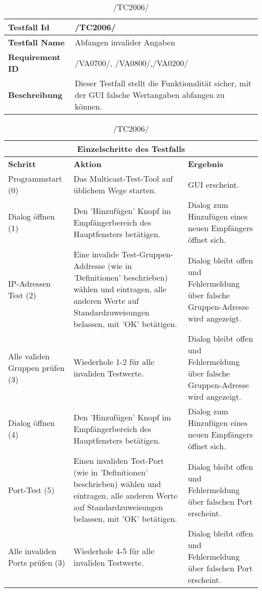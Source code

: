 \begin{table}[h]
\caption{/TC2006/}
\label{tab:TC2006}
\begin{center}
\begin{tabular}{|p{3.5cm}|p{12cm}|}
\hline
\textbf{Testfall Id} & /TC2006/\\
\hline
\textbf{Testfall Name} & Abfangen invalider Angaben\\
\hline
\textbf{Requirement ID} & /VA0700/, /VA0800/,/VA0200/\\
\hline
\textbf{Beschreibung} & Dieser Testfall stellt die Funktionalität sicher, mit
der GUI falsche Wertangaben abfangen zu können.\\
\hline
\end{tabular}
\begin{tabular}{|p{2.5cm}|p{5cm}|p{7.55cm}|}
\multicolumn{3}{|c|}{\textbf{Einzelschritte des Testfalls}} \\
\hline
\textbf{Schritt} & \textbf{Aktion} & \textbf{Ergebnis}\\
\hline
Programmstart (0)& Das Multicast-Test-Tool auf üblichem Wege starten. & GUI
erscheint.\\
\hline
Dialog öffnen (1) & Den 'Hinzufügen' Knopf im Empfängerbereich des Hauptfensters
betätigen. & Dialog zum Hinzufügen eines neuen Empfängers öffnet sich.\\
\hline
IP-Adressen Test (2) & Eine invalide Test-Gruppen-Addresse (wie in
'Definitionen' beschrieben) wählen und eintragen, alle anderen Werte auf Standardzuweisungen
belassen, mit 'OK' betätigen. & Dialog bleibt offen und Fehlermeldung über falsche
Gruppen-Adresse wird angezeigt.\\
\hline
Alle validen Gruppen prüfen (3) & Wiederhole 1-2 für alle invaliden Testwerte. & Dialog bleibt offen und Fehlermeldung über falsche
Gruppen-Adresse wird angezeigt.\\
\hline
Dialog öffnen (4) & Den 'Hinzufügen' Knopf im Empfängerbereich des Hauptfensters
betätigen. & Dialog zum Hinzufügen eines neuen Empfängers öffnet sich.\\
\hline
Port-Test (5) & Einen invaliden Test-Port (wie in 'Definitionen'
beschrieben) wählen und eintragen, alle anderen Werte auf Standardzuweisungen
belassen, mit 'OK' betätigen. & Dialog bleibt offen und Fehlermeldung über falschen
Port erscheint.\\
\hline
Alle invaliden Ports prüfen (3) & Wiederhole 4-5 für alle invaliden Testwerte. & Dialog bleibt offen und Fehlermeldung über falschen
Port erscheint.\\
\hline
\end{tabular}
\end{center}
\label{default}
\end{table}